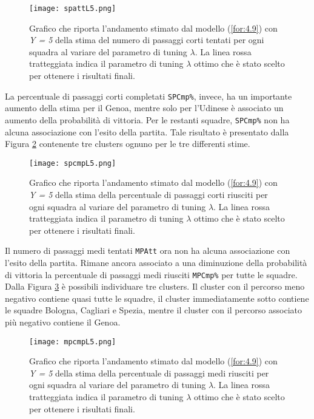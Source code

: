 \begin{figure}[htbp]
	\begin{center}
		\texttt{[image: spattL5.png]}
		\caption{Grafico che riporta l'andamento stimato dal modello (\ref{for:4.9}) con \emph{Y = 5} della stima del numero di passaggi corti tentati per ogni squadra al variare del parametro di tuning $\lambda$. La linea rossa tratteggiata indica il parametro di tuning $\lambda$ ottimo che è stato scelto per ottenere i risultati finali.} \label{fig:spattL5}
	\end{center}
\end{figure}
La percentuale di passaggi corti completati \texttt{SPCmp\%}, invece, ha un importante aumento della stima per il Genoa, mentre solo per l'Udinese è associato un aumento della probabilità di vittoria. Per le restanti squadre, \texttt{SPCmp\%} non ha alcuna associazione con l'esito della partita. Tale risultato è presentato dalla Figura \ref{fig:spcmpL5} contenente tre clusters ognuno per le tre differenti stime.
\begin{figure}[htbp]
	\begin{center}
		\texttt{[image: spcmpL5.png]}
		\caption{Grafico che riporta l'andamento stimato dal modello (\ref{for:4.9}) con \emph{Y = 5} della stima della percentuale di passaggi corti riusciti per ogni squadra al variare del parametro di tuning $\lambda$. La linea rossa tratteggiata indica il parametro di tuning $\lambda$ ottimo che è stato scelto per ottenere i risultati finali.} \label{fig:spcmpL5}
	\end{center}
\end{figure}
Il numero di passaggi medi tentati \texttt{MPAtt} ora non ha alcuna associazione con l'esito della partita. Rimane ancora associato a una diminuzione della probabilità di vittoria la percentuale di passaggi medi riusciti \texttt{MPCmp\%} per tutte le squadre. Dalla Figura \ref{fig:mpcmpL5}
è possibili individuare tre clusters. Il cluster con il percorso meno negativo contiene quasi tutte le squadre, il cluster immediatamente sotto contiene le squadre Bologna, Cagliari e Spezia, mentre il cluster con il percorso associato più negativo contiene il Genoa.
\begin{figure}[]
	\begin{center}
		\texttt{[image: mpcmpL5.png]}
		\caption{Grafico che riporta l'andamento stimato dal modello (\ref{for:4.9}) con \emph{Y = 5} della stima della percentuale di passaggi medi riusciti per ogni squadra al variare del parametro di tuning $\lambda$. La linea rossa tratteggiata indica il parametro di tuning $\lambda$ ottimo che è stato scelto per ottenere i risultati finali.} \label{fig:mpcmpL5}
	\end{center}
\end{figure}
